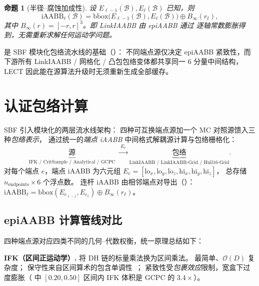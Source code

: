 \documentclass[journal]{IEEEtran}
\newtheorem{proposition}{命题}
\newcommand{\iAABB}{\mathrm{iAABB}}
\begin{document}
\begin{proposition}[半径--腐蚀加成性]\label{prop:radius_lift}
设 $E_{\ell-1}(\mathcal{B}),E_\ell(\mathcal{B})$ 已知，则
\begin{equation}
\iAABB_\ell(\mathcal{B})
=\mathrm{bbox}\bigl(E_{\ell-1}(\mathcal{B}),E_\ell(\mathcal{B})\bigr)
\oplus B_\infty(r_\ell),
\end{equation}
其中 $B_\infty(r)=[-r,r]^3$。即 LinkIAABB 由 epiAABB 通过
\emph{逐轴常数膨胀}得到，无需重新求解任何运动学问题。
\end{proposition}

 是 SBF 模块化包络流水线的基础（）：
不同端点源仅决定 epiAABB 紧致性，而下游所有
LinkIAABB / 网格化 / 凸包包络变体都共享同一 6 分量中间结构，
LECT 因此能在源算法升级时无须重新生成全部缓存。

\section{认证包络计算}\label{sec:envelope}

SBF 引入模块化的两层流水线架构：
四种可互换端点源加一个 MC 对照源馈入三种\emph{包络表示}，
通过统一的\emph{端点 iAABB} 中间格式解耦源计算与包络栅格化：
\begin{equation}\label{eq:pipeline}
  \underbrace{\text{源}}_{\text{IFK / CritSample / Analytical / GCPC}}
  \;\xrightarrow{\;E_e\;}
  \underbrace{\text{包络}}_{\text{LinkIAABB / LinkIAABB-Grid / Hull16-Grid}}.
\end{equation}
对每个端点 $e$，端点 iAABB 为六元组
$E_e = [\mathrm{lo}_x, \mathrm{lo}_y, \mathrm{lo}_z,
\mathrm{hi}_x, \mathrm{hi}_y, \mathrm{hi}_z]$，
总存储 $n_\text{endpoints} \times 6$ 个浮点数。
连杆 iAABB 由相邻端点对导出（）：
$\iAABB_\ell = \mathrm{bbox}(E_{e_{\ell-1}}, E_{e_\ell}) \oplus B_\infty(r_\ell)$。

\subsection{epiAABB 计算管线对比}\label{sec:epi_pipelines}

四种端点源对应四类不同的几何--代数权衡，统一原理总结如下：

\textbf{IFK（区间正运动学）.}
将 DH 链的标量乘法换为区间乘法。
最简单、$\mathcal{O}(D)$ 复杂度；
保守性来自区间算术的包含单调性~\cite{moore2009introduction,jaulin2001applied}；
紧致性受\emph{包裹效应}限制，宽盒下过度膨胀（ 中
$[0.20,0.50]$ 区间内 IFK 体积是 GCPC 的 $3.4\times$）。
\end{document}
